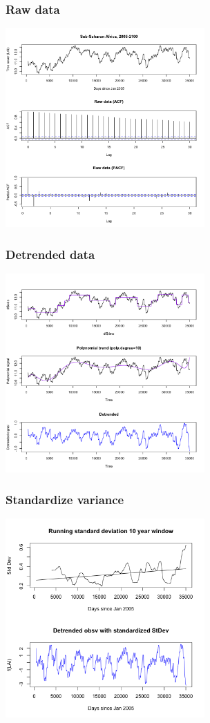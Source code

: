\documentclass{beamer}
\begin{document}
\begin{frame}
    \frametitle{Raw data}
    \includegraphics[height=3in]{../img/pacf_acf_raw.png}
\end{frame}

\begin{frame}
    \frametitle{Detrended data}
    \includegraphics[height=3in]{../img/detrended_acf_pacf.png}
\end{frame}

\begin{frame}
    \frametitle{Standardize variance}
    \includegraphics[height=3in]{../img/standatdized_var_LAI.png}
\end{frame}
\end{document}
